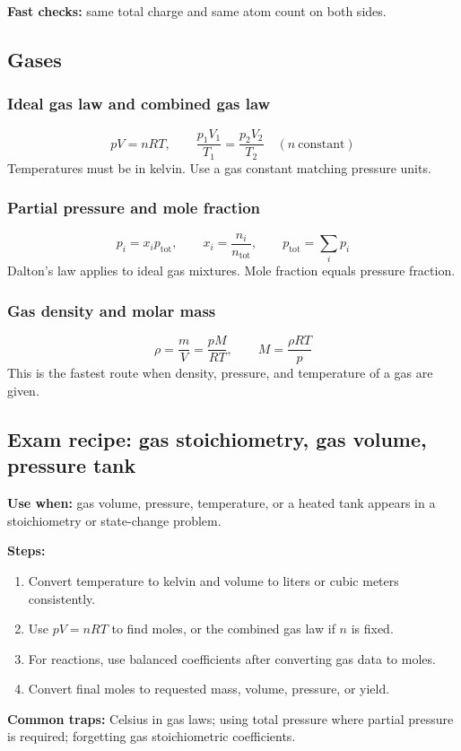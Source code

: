 \textbf{Fast checks:} same total charge and same atom count on both sides.

\subsection{Gases}

\subsubsection{Ideal gas law and combined gas law}
\[
pV=nRT, \qquad \frac{p_1V_1}{T_1}=\frac{p_2V_2}{T_2}\quad(n\ \text{constant})
\]
Temperatures must be in kelvin. Use a gas constant matching pressure units.

\subsubsection{Partial pressure and mole fraction}
\[
p_i=x_ip_{\mathrm{tot}}, \qquad x_i=\frac{n_i}{n_{\mathrm{tot}}}, \qquad p_{\mathrm{tot}}=\sum_i p_i
\]
Dalton's law applies to ideal gas mixtures. Mole fraction equals pressure fraction.

\subsubsection{Gas density and molar mass}
\[
\rho=\frac{m}{V}=\frac{pM}{RT}, \qquad M=\frac{\rho RT}{p}
\]
This is the fastest route when density, pressure, and temperature of a gas are given.

\subsection{Exam recipe: gas stoichiometry, gas volume, pressure tank}
\textbf{Use when:} gas volume, pressure, temperature, or a heated tank appears in a stoichiometry or state-change problem.

\textbf{Steps:}
\begin{enumerate}
    \item Convert temperature to kelvin and volume to liters or cubic meters consistently.
    \item Use \(pV=nRT\) to find moles, or the combined gas law if \(n\) is fixed.
    \item For reactions, use balanced coefficients after converting gas data to moles.
    \item Convert final moles to requested mass, volume, pressure, or yield.
\end{enumerate}

\textbf{Common traps:} Celsius in gas laws; using total pressure where partial pressure is required; forgetting gas stoichiometric coefficients.
